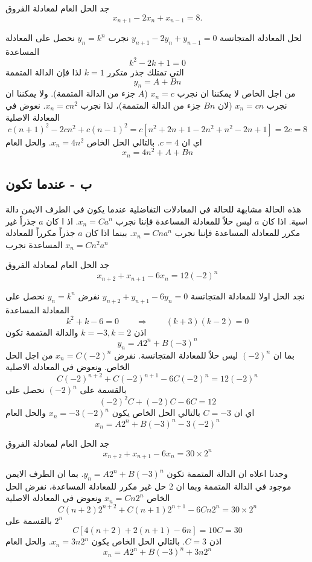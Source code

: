 \begin{example}
	جد الحل العام لمعادلة الفروق
	\[
	x_{n+1} - 2x_n + x_{n-1} = 8.
	\]
\end{example}
لحل المعادلة المتجانسة $y_{n+1} - 2y_n + y_{n-1}  = 0 $ نجرب $y_n = k^n$ نحصل على المعادلة المساعدة
\[
k^2 - 2k + 1 = 0
\]
التي تمتلك جذر متكرر $k=1$ لذا فإن الدالة المتممة 
\[
y_n = A + Bn
\]
من اجل الخاص لا يمكننا ان نجرب $x_n = c$ ($A$ جزء من الدالة المتممة). ولا يمكننا ان نجرب $x_n=cn$ (لان $Bn$ جزء من الدالة المتممة)، لذا نجرب $x_n = cn^2$. نعوض في المعادلة الاصلية 
\[
c(n+1)^2 - 2cn^2 + c(n-1)^2 = c[n^2+2n+1-2n^2+n^2-2n+1] =2c=8
\]
اي ان $c=4$. بالتالي الحل الخاص $x_n = 4n^2$. والحل العام
\[
x_n = 4n^2 + A + Bn
\]

\subsection*{ب - عندما تكون }
هذه الحالة مشابهة للحالة في المعادلات التفاضلية عندما يكون في الطرف الايمن دالة اسية. اذا كان $a$ ليس حلاً للمعادلة المساعدة فإننا نجرب $x_n = C a^n$. اذ	ا كان $a$ جذراً غير مكرر للمعادلة المساعدة فإننا نجرب $x_n = Cna^n$. بينما اذا كان $a$ جذراً مكرراً للمعادلة المساعدة نجرب $x_n = Cn^2a^n$
\newpage
\begin{example}
	جد الحل العام لمعادلة الفروق
	\[
	x_{n+2} + x_{n+1} - 6x_n = 12(-2)^n
	\]
\end{example}
\begin{solution}
	نجد الحل اولا للمعادلة المتجانسة $y_{n+2} + y_{n+1} - 6y_n  = 0 $ نفرض $y_n = k^n$ نحصل على المعادلة المساعدة
	\[
	k^2 + k - 6 = 0\qquad \Rightarrow \qquad (k+3)(k-2)=0
	\]
	اذن $k=-3, k=2 $ والدالة المتممة تكون
	\[
	y_n = A 2^n + B (-3)^n
	\]
	بما ان $(-2)^n$ ليس حلاً للمعادلة المتجانسة. نفرض $x_n = C (-2)^n$ من اجل الحل الخاص. ونعوض في المعادلة الاصلية
	\[
	C(-2)^{n+2} + C(-2)^{n+1} - 6C(-2)^{n} = 12(-2)^n
	\]
	بالقسمة على $(-2)^n$ نحصل على 
	\[
	(-2)^2 C + (-2)C -6C = 12
	\]
	اي ان $C=-3$ بالتالي الحل الخاص يكون $x_n = -3(-2)^n$ والحل العام 
	\[
	x_n = A2^n + B(-3)^n -3(-2)^n
	\]
\end{solution}

\begin{example}
	جد الحل العام لمعادلة الفروق 
	\[
	x_{n+2} + x_{n+1} - 6x_n = 30 \times 2^n
	\]
\end{example}
\begin{solution}
	وجدنا اعلاه ان الدالة المتممة تكون  $y_n = A 2^n + B (-3)^n$. بما ان الطرف الايمن موجود في الدالة المتممة وبما ان 2 حل غير مكرر للمعادلة المساعدة، نفرض الحل الخاص $x_n = Cn2^n$ ونعوض في المعادلة الاصلية
	\[
	C(n+2)2^{n+2} + C(n+1)2^{n+1} - 6Cn2^{n} = 30 \times2^n
	\] 
	بالقسمة على $2^n$ 
	\[
	C[4(n+2) + 2(n+1) -6n] = 10C = 30
	\]
	اذن $C = 3$. بالتالي الحل الخاص يكون $x_n = 3n2^n$. والحل العام 
	\[
	x_n = A2^n + B(-3)^n + 3n2^n
	\]
\end{solution}